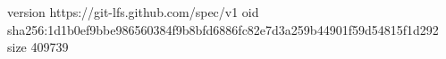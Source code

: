 version https://git-lfs.github.com/spec/v1
oid sha256:1d1b0ef9bbe986560384f9b8bfd6886fc82e7d3a259b44901f59d54815f1d292
size 409739
